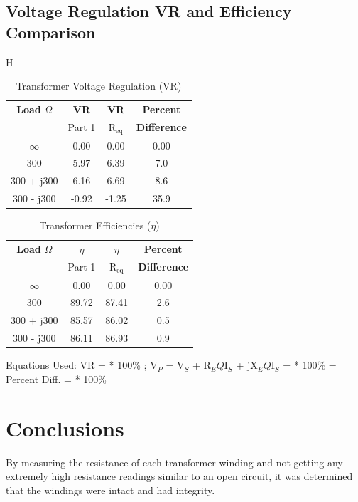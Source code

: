 \documentclass{article}
\begin{document}
\subsection{Voltage Regulation VR and Efficiency \eta Comparison}
\begin{table}{H}
  \centering
  \begin{tabular}{*{4}{c}}
    \textbf{Load} $\Omega$ & \textbf{VR} & \textbf{VR} & \textbf{Percent} \\
    & Part 1 & R$_\text{eq}$ & \textbf{Difference} \\
    \hline
    $\infty$ & 0.00 & 0.00 & 0.00 \\
    300 & 5.97 & 6.39 & 7.0 \\
    300 + j300 & 6.16 & 6.69 & 8.6 \\
    300 - j300 & -0.92 & -1.25 & 35.9 \\
  \end{tabular}
  \caption{Transformer Voltage Regulation (VR)}
  \label{tab:vr}
\end{table}

\begin{table}[H]
  \centering
  \begin{tabular}{*{4}{c}}
    \textbf{Load} $\Omega$ & $\eta$ & $\eta$ & \textbf{Percent} \\
    & Part 1 & R$_\text{eq}$ & \textbf{Difference} \\
    \hline
    $\infty$ & 0.00 & 0.00 & 0.00 \\
    300 & 89.72 & 87.41 & 2.6 \\
    300 + j300 & 85.57 & 86.02 & 0.5 \\
    300 - j300 & 86.11 & 86.93 & 0.9 \\
  \end{tabular}
  \caption{Transformer Efficiencies ($\eta$)}
  \label{tab:eff}
\end{table}

Equations Used:
VR =  * 100\% ; V$_P$ = V$_S$ + R$_EQ$I$_S$ + jX$_EQ$I$_S$
\eta =  * 100\% = 
Percent Diff. =  * 100\%

\section{Conclusions}

By measuring the resistance of each transformer winding and not getting any extremely high resistance readings
similar to an open circuit, it was determined that the windings were intact and had integrity.
\end{document}
